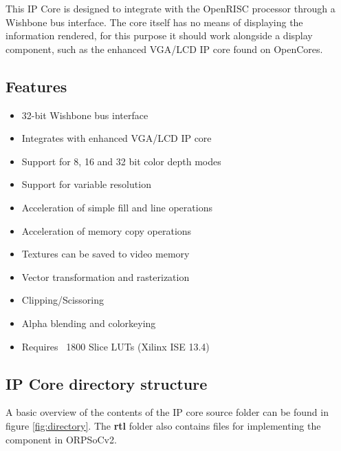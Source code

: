 \documentclass[10pt,a4paper]{article}
\begin{document}
This IP Core is designed to integrate with the OpenRISC processor through a Wishbone bus interface. The core itself has no means of displaying the information rendered, for this purpose it should work alongside a display component, such as the enhanced VGA/LCD IP core found on OpenCores.

\subsection{Features}
\begin{itemize}
\item 32-bit Wishbone bus interface
\item Integrates with enhanced VGA/LCD IP core
\item Support for 8, 16 and 32 bit color depth modes
\item Support for variable resolution
\item Acceleration of simple fill and line operations
\item Acceleration of memory copy operations
\item Textures can be saved to video memory
\item Vector transformation and rasterization
\item Clipping/Scissoring
\item Alpha blending and colorkeying
\item Requires ~1800 Slice LUTs (Xilinx ISE 13.4)
\end{itemize}

\subsection{IP Core directory structure}
A basic overview of the contents of the IP core source folder can be found in figure \ref{fig:directory}. The \textbf{rtl} folder also contains files for implementing the component in ORPSoCv2.
\end{document}
